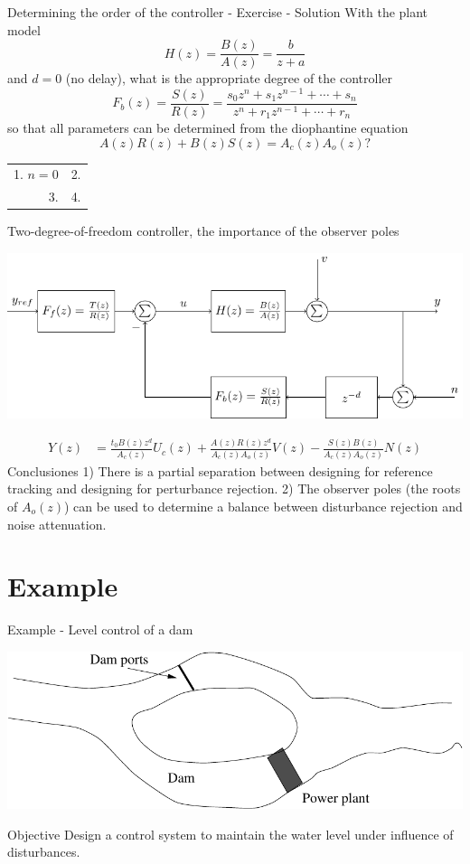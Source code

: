 \documentclass[presentation,aspectratio=169]{beamer}
\begin{document}
\begin{frame}[label={sec:orgefa8757}]{Determining the order of the controller - Exercise - Solution}
With the plant model \[H(z) = \frac{B(z)}{A(z)} = \frac{b}{z + a}\] and \(d=0\) (no delay), what is the appropriate degree of the controller \[F_b(z) = \frac{S(z)}{R(z)} = \frac{s_0z^n + s_1z^{n-1} + \cdots + s_n}{z^n + r_1 z^{n-1} + \cdots + r_n}\]
so that all parameters can be determined from the diophantine equation
\[ A(z)R(z) + B(z)S(z) = A_c(z)A_o(z)?\]
\begin{center}
\begin{tabular}{rr}
1. \(n = 0\) & 2.\\
3. & 4.\\
\end{tabular}
\end{center}
\end{frame}


\begin{frame}[label={sec:orgcbd8cc2}]{Two-degree-of-freedom controller, the importance of the observer poles}
\begin{center}
\includegraphics[width=0.7\linewidth]{../../figures/2dof-block-explicit}
\end{center}
\begin{align*}
Y(z) &= \frac{t_0B(z)z^d}{A_c(z)}U_c(z) + \frac{A(z)R(z)z^d}{A_c(z)A_o(z)}V(z)- \frac{S(z)B(z)}{A_c(z)A_o(z)}N(z)
\end{align*}
\alert{Conclusiones} 1) There is a partial separation between designing for reference tracking and designing for perturbance rejection. 2) The observer poles (the roots of \(A_o(z)\)) can be used to determine a balance between disturbance rejection and noise attenuation.
\end{frame}




\section{Example}
\label{sec:orgabd7f07}
\begin{frame}[label={sec:org2ecba8c}]{Example - Level control of a dam}
\begin{center}
\includegraphics[width=0.5\linewidth]{../../figures/kraftverk}
\end{center}

\alert{Objective} Design a control system to maintain the water level under influence of disturbances.
\end{frame}
\end{document}
